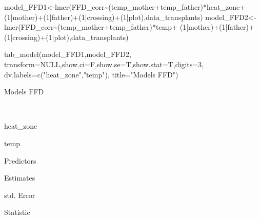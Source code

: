\documentclass[
]{article}
\newenvironment{Shaded}{\begin{snugshade}}{\end{snugshade}}
\newcommand{\AttributeTok}[1]{\textcolor[rgb]{0.77,0.63,0.00}{#1}}
\newcommand{\ConstantTok}[1]{\textcolor[rgb]{0.00,0.00,0.00}{#1}}
\newcommand{\DecValTok}[1]{\textcolor[rgb]{0.00,0.00,0.81}{#1}}
\newcommand{\FunctionTok}[1]{\textcolor[rgb]{0.00,0.00,0.00}{#1}}
\newcommand{\NormalTok}[1]{#1}
\newcommand{\OtherTok}[1]{\textcolor[rgb]{0.56,0.35,0.01}{#1}}
\newcommand{\SpecialCharTok}[1]{\textcolor[rgb]{0.00,0.00,0.00}{#1}}
\newcommand{\StringTok}[1]{\textcolor[rgb]{0.31,0.60,0.02}{#1}}
\begin{document}
\begin{Shaded}
\begin{Highlighting}[]
\NormalTok{model\_FFD1}\OtherTok{\textless{}{-}}\FunctionTok{lmer}\NormalTok{(FFD\_corr}\SpecialCharTok{\textasciitilde{}}\NormalTok{(temp\_mother}\SpecialCharTok{+}\NormalTok{temp\_father)}\SpecialCharTok{*}\NormalTok{heat\_zone}\SpecialCharTok{+}
\NormalTok{                   (}\DecValTok{1}\SpecialCharTok{|}\NormalTok{mother)}\SpecialCharTok{+}\NormalTok{(}\DecValTok{1}\SpecialCharTok{|}\NormalTok{father)}\SpecialCharTok{+}\NormalTok{(}\DecValTok{1}\SpecialCharTok{|}\NormalTok{crossing)}\SpecialCharTok{+}\NormalTok{(}\DecValTok{1}\SpecialCharTok{|}\NormalTok{plot),data\_transplants)}
\NormalTok{model\_FFD2}\OtherTok{\textless{}{-}}\FunctionTok{lmer}\NormalTok{(FFD\_corr}\SpecialCharTok{\textasciitilde{}}\NormalTok{(temp\_mother}\SpecialCharTok{+}\NormalTok{temp\_father)}\SpecialCharTok{*}\NormalTok{temp}\SpecialCharTok{+}
\NormalTok{                   (}\DecValTok{1}\SpecialCharTok{|}\NormalTok{mother)}\SpecialCharTok{+}\NormalTok{(}\DecValTok{1}\SpecialCharTok{|}\NormalTok{father)}\SpecialCharTok{+}\NormalTok{(}\DecValTok{1}\SpecialCharTok{|}\NormalTok{crossing)}\SpecialCharTok{+}\NormalTok{(}\DecValTok{1}\SpecialCharTok{|}\NormalTok{plot),data\_transplants)}
\end{Highlighting}
\end{Shaded}

\begin{Shaded}
\begin{Highlighting}[]
\FunctionTok{tab\_model}\NormalTok{(model\_FFD1,model\_FFD2,}
          \AttributeTok{transform=}\ConstantTok{NULL}\NormalTok{,}\AttributeTok{show.ci=}\NormalTok{F,}\AttributeTok{show.se=}\NormalTok{T,}\AttributeTok{show.stat=}\NormalTok{T,}\AttributeTok{digits=}\DecValTok{3}\NormalTok{,}
          \AttributeTok{dv.labels=}\FunctionTok{c}\NormalTok{(}\StringTok{"heat\_zone"}\NormalTok{,}\StringTok{"temp"}\NormalTok{),}
          \AttributeTok{title=}\StringTok{"Models FFD"}\NormalTok{)}
\end{Highlighting}
\end{Shaded}

Models FFD

~

heat\_zone

temp

Predictors

Estimates

std. Error

Statistic
\end{document}
